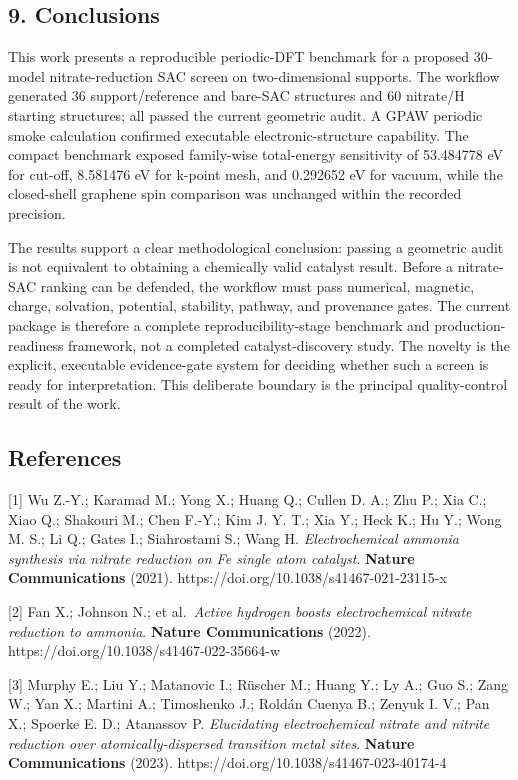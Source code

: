 \documentclass[
]{article}
\begin{document}
\hypertarget{conclusions}{%
\subsection{9. Conclusions}\label{conclusions}}

This work presents a reproducible periodic-DFT benchmark for a proposed
30-model nitrate-reduction SAC screen on two-dimensional supports. The
workflow generated 36 support/reference and bare-SAC structures and 60
nitrate/H starting structures; all passed the current geometric audit. A
GPAW periodic smoke calculation confirmed executable
electronic-structure capability. The compact benchmark exposed
family-wise total-energy sensitivity of 53.484778 eV for cut-off,
8.581476 eV for k-point mesh, and 0.292652 eV for vacuum, while the
closed-shell graphene spin comparison was unchanged within the recorded
precision.

The results support a clear methodological conclusion: passing a
geometric audit is not equivalent to obtaining a chemically valid
catalyst result. Before a nitrate-SAC ranking can be defended, the
workflow must pass numerical, magnetic, charge, solvation, potential,
stability, pathway, and provenance gates. The current package is
therefore a complete reproducibility-stage benchmark and
production-readiness framework, not a completed catalyst-discovery
study. The novelty is the explicit, executable evidence-gate system for
deciding whether such a screen is ready for interpretation. This
deliberate boundary is the principal quality-control result of the work.

\hypertarget{references}{%
\subsection{References}\label{references}}

{[}1{]} Wu Z.-Y.; Karamad M.; Yong X.; Huang Q.; Cullen D. A.; Zhu P.;
Xia C.; Xiao Q.; Shakouri M.; Chen F.-Y.; Kim J. Y. T.; Xia Y.; Heck K.;
Hu Y.; Wong M. S.; Li Q.; Gates I.; Siahrostami S.; Wang H.
\emph{Electrochemical ammonia synthesis via nitrate reduction on Fe
single atom catalyst}. \textbf{Nature Communications} (2021).
https://doi.org/10.1038/s41467-021-23115-x

{[}2{]} Fan X.; Johnson N.; et al.~\emph{Active hydrogen boosts
electrochemical nitrate reduction to ammonia}. \textbf{Nature
Communications} (2022). https://doi.org/10.1038/s41467-022-35664-w

{[}3{]} Murphy E.; Liu Y.; Matanovic I.; Rüscher M.; Huang Y.; Ly A.;
Guo S.; Zang W.; Yan X.; Martini A.; Timoshenko J.; Roldán Cuenya B.;
Zenyuk I. V.; Pan X.; Spoerke E. D.; Atanassov P. \emph{Elucidating
electrochemical nitrate and nitrite reduction over atomically-dispersed
transition metal sites}. \textbf{Nature Communications} (2023).
https://doi.org/10.1038/s41467-023-40174-4
\end{document}
